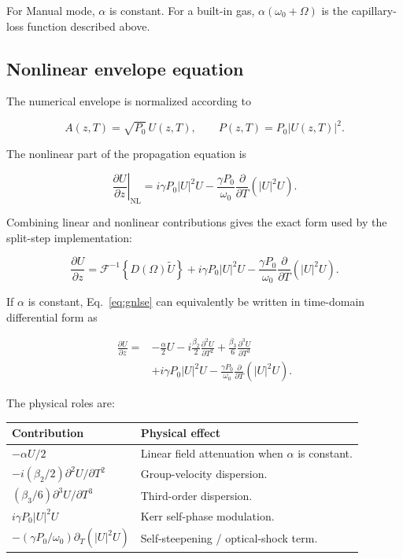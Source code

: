 \documentclass[11pt,a4paper]{article}
\begin{document}
For Manual mode, $\alpha$ is constant. For a built-in gas,
$\alpha(\omega_0+\Omega)$ is the capillary-loss function described above.

\subsection{Nonlinear envelope equation}

The numerical envelope is normalized according to

\begin{equation}
A(z,T)=\sqrt{P_0}\,U(z,T),
\qquad
P(z,T)=P_0|U(z,T)|^2.
\end{equation}

The nonlinear part of the propagation equation is

\begin{equation}
\boxed{
\left.
\frac{\partial U}{\partial z}
\right|_{\mathrm{NL}}
=
 i\gamma P_0|U|^2U
-
\frac{\gamma P_0}{\omega_0}
\frac{\partial}{\partial T}\left(|U|^2U\right).
}
\end{equation}

Combining linear and nonlinear contributions gives the exact form used by the
split-step implementation:

\begin{equation}
\boxed{
\frac{\partial U}{\partial z}
=
\mathcal F^{-1}
\left\{
D(\Omega)\widetilde U
\right\}
+
 i\gamma P_0|U|^2U
-
\frac{\gamma P_0}{\omega_0}
\frac{\partial}{\partial T}\left(|U|^2U\right).
}
\label{eq:gnlse}
\end{equation}

If $\alpha$ is constant, Eq.~\eqref{eq:gnlse} can equivalently be written in
time-domain differential form as

\begin{align}
\frac{\partial U}{\partial z}
={}&
-\frac{\alpha}{2}U
-i\frac{\beta_2}{2}
\frac{\partial^2U}{\partial T^2}
+\frac{\beta_3}{6}
\frac{\partial^3U}{\partial T^3}
\nonumber\\
&+
 i\gamma P_0|U|^2U
-
\frac{\gamma P_0}{\omega_0}
\frac{\partial}{\partial T}\left(|U|^2U\right).
\end{align}

The physical roles are:

\begin{center}
\begin{tabular}{p{}p{}}
\toprule
\textbf{Contribution} & \textbf{Physical effect}\\
\midrule
$-\alpha U/2$ & Linear field attenuation when $\alpha$ is constant.\\[0.4em]
$-i(\beta_2/2)\partial^2U/\partial T^2$ & Group-velocity dispersion.\\[0.4em]
$(\beta_3/6)\partial^3U/\partial T^3$ & Third-order dispersion.\\[0.4em]
$i\gamma P_0|U|^2U$ & Kerr self-phase modulation.\\[0.4em]
$-(\gamma P_0/\omega_0)\partial_T(|U|^2U)$ & Self-steepening / optical-shock term.\\
\bottomrule
\end{tabular}
\end{center}
\end{document}
